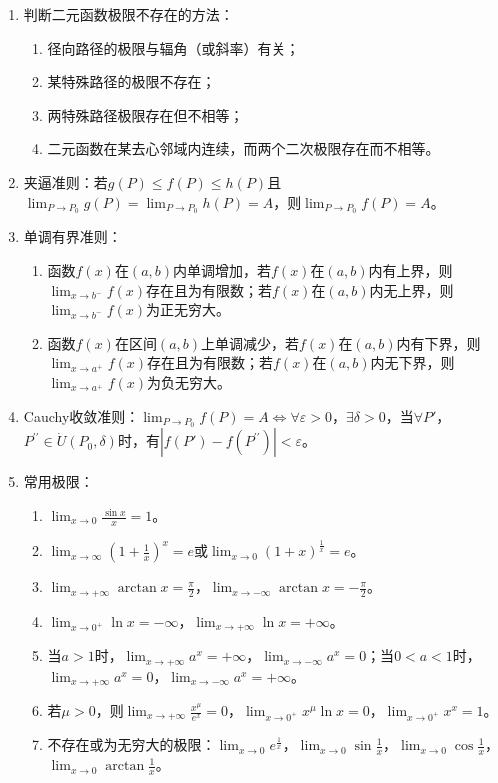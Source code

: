 \documentclass[UTF8]{ctexart}
\theoremstyle{remark}
\begin{document}
\begin{enumerate}
			\item 判断二元函数极限不存在的方法：
			\begin{enumerate}
				\item 径向路径的极限与辐角（或斜率）有关；
				\item 某特殊路径的极限不存在；
				\item 两特殊路径极限存在但不相等；
				\item 二元函数在某去心邻域内连续，而两个二次极限存在而不相等。
			\end{enumerate}
			
			\item 夹逼准则：若$g(P) \leq f(P) \leq h(P)$且$\lim _{P \to P_{0}} g(P)=\lim _{P \to P_{0}} h(P)=A$，则$\lim _{P \to P_{0}} f(P)=A$。
			
			\item 单调有界准则：
			\begin{enumerate}
				\item 函数$f(x)$在$(a, b)$内单调增加，若$f(x)$在$(a, b)$内有上界，则$\lim _{x \to b^{-}} f(x)$存在且为有限数；若$f(x)$在$(a, b)$内无上界，则$\lim _{x \to b^{-}} f(x)$为正无穷大。
				\item 函数$f(x)$在区间$(a, b)$上单调减少，若$f(x)$在$(a, b)$内有下界，则$\lim _{x \to a^{+}} f(x)$存在且为有限数；若$f(x)$在$(a, b)$内无下界，则$\lim _{x \to a^{+}} f(x)$为负无穷大。
			\end{enumerate}
			
			\item Cauchy收敛准则：$\lim _{P \to P_{0}} f(P)=A \Leftrightarrow \forall \varepsilon>0$，$\exists \delta>0$，当$\forall P'$，$P^{\prime \prime} \in \dot{U}(P_{0}, \delta)$时，有$|f(P')-f(P^{\prime \prime})|<\varepsilon$。
			
			\item 常用极限：
			\begin{enumerate}
				\item $\lim _{x \to 0} \frac{\sin x}{x}=1$。
				\item $\lim _{x \to \infty}\left(1+\frac{1}{x}\right)^{x}=e$或$\lim _{x \to 0}(1+x)^{\frac{1}{x}}=e$。
				\item $\lim _{x \to+\infty} \arctan x=\frac{\pi}{2}$，$\lim _{x \to-\infty} \arctan x=-\frac{\pi}{2}$。
				\item $\lim _{x \to 0^{+}} \ln x=-\infty$，$\lim _{x \to+\infty} \ln x=+\infty$。
				\item 当$a>1$时，$\lim _{x \to +\infty} a^{x}=+\infty$，$\lim _{x \to -\infty} a^{x}=0$；当$0<a<1$时，$\lim _{x \to +\infty} a^{x}=0$，$\lim _{x \to -\infty} a^{x}=+\infty$。
				\item 若$\mu>0$，则$\lim _{x \to +\infty} \frac{x^{\mu}}{e^{x}}=0$，$\lim _{x \to 0^{+}} x^{\mu} \ln x=0$，$\lim _{x \to 0^{+}} x^{x}=1$。
				\item 不存在或为无穷大的极限：$\lim _{x \to 0} e^{\frac{1}{x}}$，$\lim _{x \to 0} \sin \frac{1}{x}$，$\lim _{x \to 0} \cos \frac{1}{x}$，$\lim _{x \to 0} \arctan \frac{1}{x}$。
			\end{enumerate}
			

\end{enumerate}
\end{document}
